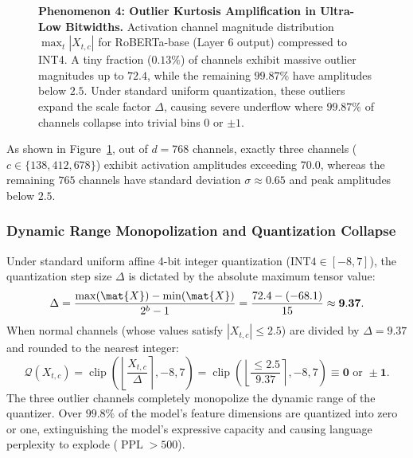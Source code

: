 \begin{figure}[t]
{\begin{tikzpicture}[
    font=\sffamily\small,
    >=Stealth,
    xscale=0.08,
    yscale=0.075
]
\end{tikzpicture}
}
\caption[Phenomenon 4]{\textbf{Phenomenon 4: Outlier Kurtosis Amplification in Ultra-Low Bitwidths.} Activation channel magnitude distribution $\max_t |X_{t, c}|$ for RoBERTa-base (Layer 6 output) compressed to INT4. A tiny fraction ($0.13\%$) of channels exhibit massive outlier magnitudes up to $72.4$, while the remaining $99.87\%$ have amplitudes below $2.5$. Under standard uniform quantization, these outliers expand the scale factor $\Delta$, causing severe underflow where $99.87\%$ of channels collapse into trivial bins $0$ or $\pm 1$.}
\label{fig:phenom4_kurtosis_spikes}
\end{figure}

As shown in Figure~\ref{fig:phenom4_kurtosis_spikes}, out of $d=768$ channels, exactly three channels ($c \in \{138, 412, 678\}$) exhibit activation amplitudes exceeding $70.0$, whereas the remaining $765$ channels have standard deviation $\sigma \approx 0.65$ and peak amplitudes below $2.5$.

\subsubsection{Dynamic Range Monopolization and Quantization Collapse}
\label{sec:phenom_kurtosis_collapse}

Under standard uniform affine 4-bit integer quantization ($\text{INT4} \in [-8, 7]$), the quantization step size $\Delta$ is dictated by the absolute maximum tensor value:
\begin{equation}
\Delta = \frac{\max(\mat{X}) - \min(\mat{X})}{2^b - 1} = \frac{72.4 - (-68.1)}{15} \approx \mathbf{9.37}.
\end{equation}
When normal channels (whose values satisfy $|X_{t, c}| \le 2.5$) are divided by $\Delta = 9.37$ and rounded to the nearest integer:
\begin{equation}
\mathcal{Q}(X_{t, c}) = \operatorname{clip}\left( \left\lfloor \frac{X_{t, c}}{\Delta} \right\rceil, -8, 7 \right) = \operatorname{clip}\left( \left\lfloor \frac{\le 2.5}{9.37} \right\rceil, -8, 7 \right) \equiv \mathbf{0} \text{ or } \pm \mathbf{1}.
\end{equation}
The three outlier channels completely monopolize the dynamic range of the quantizer. Over $99.8\%$ of the model's feature dimensions are quantized into zero or one, extinguishing the model's expressive capacity and causing language perplexity to explode ($\operatorname{PPL} > 500$).

